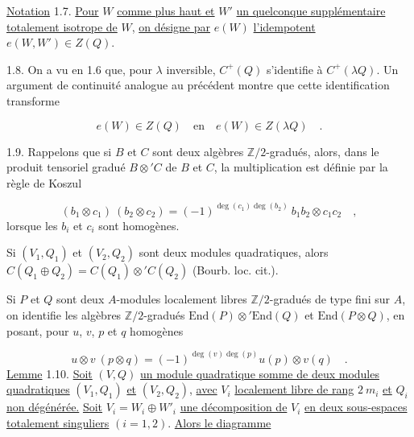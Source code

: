 \underline{Notation} 1.7. \underline{Pour} $W$ \underline{comme plus haut et} $W'$ \underline{un quelconque supplémentaire totalement isotrope de} $W$, \underline{on désigne par} $e(W)$ \underline{l'idempotent} $e(W,W') \in Z(Q)$.

1.8. On a vu en 1.6 que, pour $\lambda$ inversible, $C^+(Q)$ s'identifie à $C^+(\lambda Q)$. Un argument de continuité analogue au précédent montre que cette identification transforme

\begin{equation*}
e(W) \in Z(Q) \quad \mbox{en} \quad e(W) \in Z(\lambda Q) \quad .
\end{equation*}


1.9. Rappelons que si $B$ et $C$ sont deux algèbres $\mathbb{Z}/2$-gradués, alors, dans le produit tensoriel gradué $B \otimes' C$ de $B$ et $C$, la multiplication est définie par la règle de Koszul

\begin{equation*}
(b_1 \otimes c_1)\ (b_2 \otimes c_2) = (-1)^{\deg(c_1)\deg(b_2)}\ b_1 b_2 \otimes c_1 c_2 \quad ,
\end{equation*}
lorsque les $b_i$ et $c_i$ sont homogènes.

Si $(V_1, Q_1)$ et $(V_2, Q_2)$ sont deux modules quadratiques, alors $C(Q_1 \oplus Q_2) = C(Q_1) \otimes' C(Q_2)$ (Bourb. loc. cit.).

Si $P$ et $Q$ sont deux $A$-modules localement libres $\mathbb{Z}/2$-gradués de type fini sur $A$, on identifie les algèbres $\mathbb{Z}/2$-gradués $\mathrm{End}(P) \otimes' \mathrm{End}(Q)$ et $\mathrm{End}(P \otimes Q)$, en posant, pour $u$, $v$, $p$ et $q$ homogènes

\begin{equation*}
u \otimes v\ (p \otimes q) = (-1)^{\deg(v)\deg(p)} u(p) \otimes v(q) \quad .
\end{equation*}
\underline{Lemme} 1.10. \underline{Soit} $(V,Q)$ \underline{un module quadratique somme de deux modules quadratiques} $(V_1, Q_1)$ \underline{et} $(V_2, Q_2)$, \underline{avec} $V_i$ \underline{localement libre de rang} $2\ m_i$ \underline{et} $Q_i$ \underline{non dégénérée.} \underline{Soit} $V_i = W_i \oplus W'_i$ \underline{une décomposition de} $V_i$ \underline{en deux sous-espaces totalement singuliers} $(i = 1, 2)$. \underline{Alors le diagramme}

